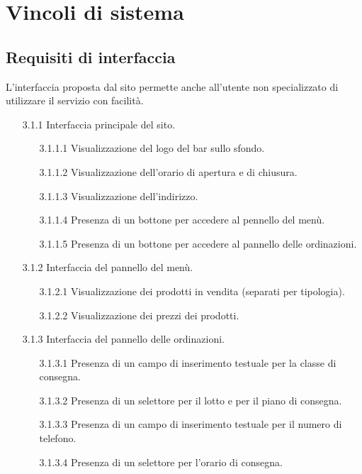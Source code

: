 \documentclass[a4paper,11pt]{article}       %
\begin{document}
\section{Vincoli di sistema}
    \subsection{Requisiti di interfaccia}
    L'interfaccia proposta dal sito permette anche all'utente non specializzato di utilizzare il servizio con facilità.
    \begin{itemize}
        \item[3.1.1] Interfaccia principale del sito.
            \begin{itemize}
                \item[3.1.1.1] Visualizzazione del logo del bar sullo sfondo.
                \item[3.1.1.2] Visualizzazione dell'orario di apertura e di chiusura.
                \item[3.1.1.3] Visualizzazione dell'indirizzo.
                \item[3.1.1.4] Presenza di un bottone per accedere al pennello del menù.
                \item[3.1.1.5] Presenza di un bottone per accedere al pannello delle ordinazioni.
            \end{itemize}
        \item[3.1.2] Interfaccia del pannello del menù.
            \begin{itemize}
                \item[3.1.2.1] Visualizzazione dei prodotti in vendita (separati per tipologia).
                \item[3.1.2.2] Visualizzazione dei prezzi dei prodotti.
            \end{itemize}
        \item[3.1.3] Interfaccia del pannello delle ordinazioni.
            \begin{itemize}
                \item[3.1.3.1] Presenza di un campo di inserimento testuale per la classe di consegna.
                \item[3.1.3.2] Presenza di un selettore per il lotto e per il piano di consegna.
                \item[3.1.3.3] Presenza di un campo di inserimento testuale per il numero di telefono.
                \item[3.1.3.4] Presenza di un selettore per l'orario di consegna.

\end{itemize}
\end{itemize}
\end{document}
